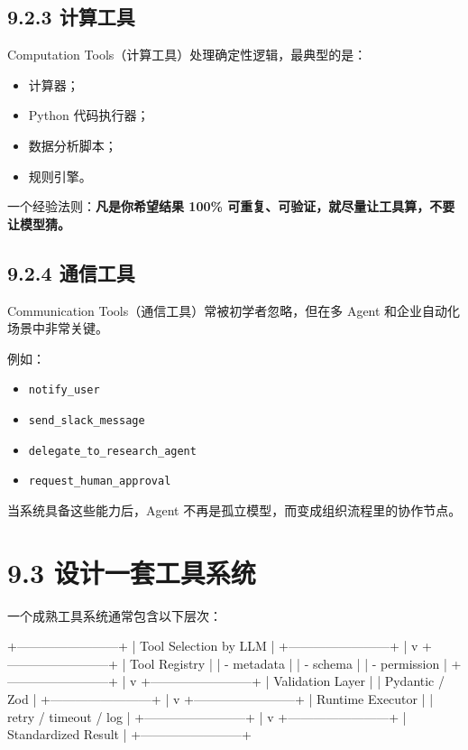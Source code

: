 \subsection{9.2.3 计算工具}

Computation Tools（计算工具）处理确定性逻辑，最典型的是：


\begin{itemize}[leftmargin=2em]
\item 计算器；
\item Python 代码执行器；
\item 数据分析脚本；
\item 规则引擎。
\end{itemize}

一个经验法则：\textbf{凡是你希望结果 100\% 可重复、可验证，就尽量让工具算，不要让模型猜。}


\subsection{9.2.4 通信工具}

Communication Tools（通信工具）常被初学者忽略，但在多 Agent 和企业自动化场景中非常关键。


例如：


\begin{itemize}[leftmargin=2em]
\item \texttt{notify\_user}
\item \texttt{send\_slack\_message}
\item \texttt{delegate\_to\_research\_agent}
\item \texttt{request\_human\_approval}
\end{itemize}

当系统具备这些能力后，Agent 不再是孤立模型，而变成组织流程里的协作节点。


\section{9.3 设计一套工具系统}

一个成熟工具系统通常包含以下层次：


\begin{codeblock}
+------------------------+
| Tool Selection by LLM  |
+------------------------+
           |
           v
+------------------------+
| Tool Registry          |
| - metadata             |
| - schema               |
| - permission           |
+------------------------+
           |
           v
+------------------------+
| Validation Layer       |
| Pydantic / Zod         |
+------------------------+
           |
           v
+------------------------+
| Runtime Executor       |
| retry / timeout / log  |
+------------------------+
           |
           v
+------------------------+
| Standardized Result    |
+------------------------+
\end{codeblock}

